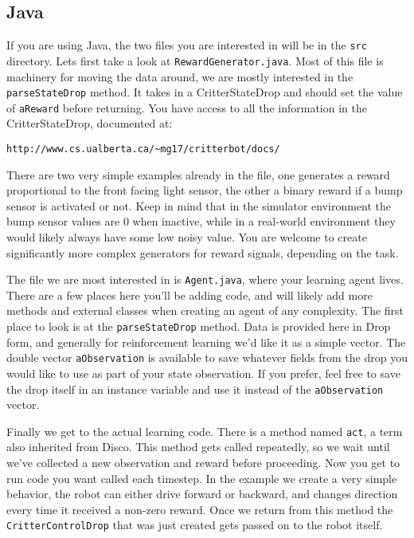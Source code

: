 \documentclass[12pt]{article}
\begin{document}
\subsection{Java}\label{subsec:java_agent}

If you are using Java, the two files you are interested in will be in the \verb+src+ directory.  Lets first take a look at \verb+RewardGenerator.java+.  Most of this file is machinery for moving the data around, we are mostly interested in the \verb+parseStateDrop+ method.  It takes in a CritterStateDrop and should set the value of \verb+aReward+ before returning.  You have access to all the information in the CritterStateDrop, documented at:

\begin{verbatim}
http://www.cs.ualberta.ca/~mg17/critterbot/docs/
\end{verbatim}

There are two very simple examples already in the file, one generates a reward proportional to the front facing light sensor, the other a binary reward if a bump sensor is activated or not.  Keep in mind that in the simulator environment the bump sensor values are 0 when inactive, while in a real-world environment they would likely always have some low noisy value.  You are welcome to create significantly more complex generators for reward signals, depending on the task.

The file we are most interested in is \verb+Agent.java+, where your learning agent lives.  There are a few places here you'll be adding code, and will likely add more methods and external classes when creating an agent of any complexity.  The first place to look is at the \verb+parseStateDrop+ method.  Data is provided here in Drop form, and generally for reinforcement learning we'd like it as a simple vector.  The double vector \verb+aObservation+ is available to save whatever fields from the drop you would like to use as part of your state observation.  If you prefer, feel free to save the drop itself in an instance variable and use it instead of the \verb+aObservation+ vector.

Finally we get to the actual learning code.  There is a method named \verb+act+, a term also inherited from Disco.  This method gets called repeatedly, so we wait until we've collected a new observation and reward before proceeding.  Now you get to run code you want called each timestep.  In the example we create a very simple behavior, the robot can either drive forward or backward, and changes direction every time it received a non-zero reward.  Once we return from this method the \verb+CritterControlDrop+ that was just created gets passed on to the robot itself.
\end{document}
